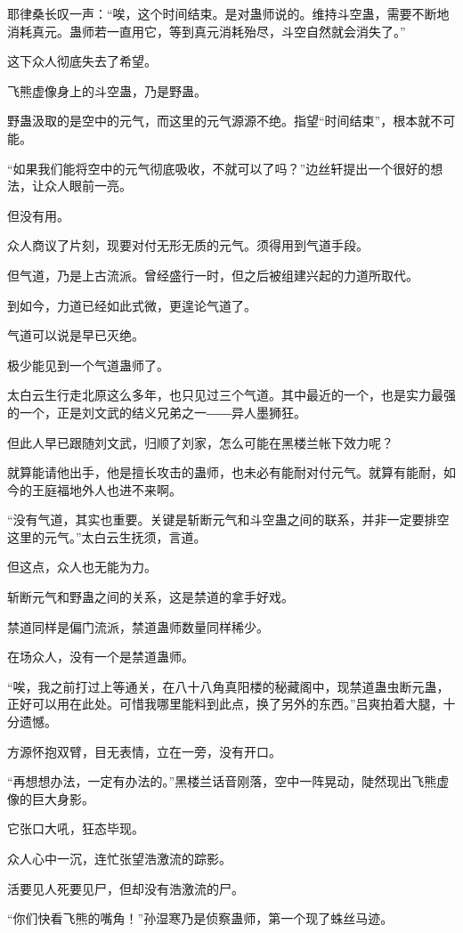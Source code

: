 \begin{this_body}
耶律桑长叹一声：“唉，这个时间结束。是对蛊师说的。维持斗空蛊，需要不断地消耗真元。蛊师若一直用它，等到真元消耗殆尽，斗空自然就会消失了。”

这下众人彻底失去了希望。

飞熊虚像身上的斗空蛊，乃是野蛊。

野蛊汲取的是空中的元气，而这里的元气源源不绝。指望“时间结束”，根本就不可能。

“如果我们能将空中的元气彻底吸收，不就可以了吗？”边丝轩提出一个很好的想法，让众人眼前一亮。

但没有用。

众人商议了片刻，现要对付无形无质的元气。须得用到气道手段。

但气道，乃是上古流派。曾经盛行一时，但之后被组建兴起的力道所取代。

到如今，力道已经如此式微，更遑论气道了。

气道可以说是早已灭绝。

极少能见到一个气道蛊师了。

太白云生行走北原这么多年，也只见过三个气道。其中最近的一个，也是实力最强的一个，正是刘文武的结义兄弟之一――异人墨狮狂。

但此人早已跟随刘文武，归顺了刘家，怎么可能在黑楼兰帐下效力呢？

就算能请他出手，他是擅长攻击的蛊师，也未必有能耐对付元气。就算有能耐，如今的王庭福地外人也进不来啊。

“没有气道，其实也重要。关键是斩断元气和斗空蛊之间的联系，并非一定要排空这里的元气。”太白云生抚须，言道。

但这点，众人也无能为力。

斩断元气和野蛊之间的关系，这是禁道的拿手好戏。

禁道同样是偏门流派，禁道蛊师数量同样稀少。

在场众人，没有一个是禁道蛊师。

“唉，我之前打过上等通关，在八十八角真阳楼的秘藏阁中，现禁道蛊虫断元蛊，正好可以用在此处。可惜我哪里能料到此点，换了另外的东西。”吕爽拍着大腿，十分遗憾。

方源怀抱双臂，目无表情，立在一旁，没有开口。

“再想想办法，一定有办法的。”黑楼兰话音刚落，空中一阵晃动，陡然现出飞熊虚像的巨大身影。

它张口大吼，狂态毕现。

众人心中一沉，连忙张望浩激流的踪影。

活要见人死要见尸，但却没有浩激流的尸。

“你们快看飞熊的嘴角！”孙湿寒乃是侦察蛊师，第一个现了蛛丝马迹。


\end{this_body}
